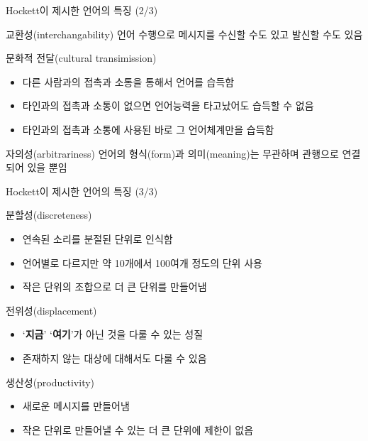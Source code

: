 \documentclass[11pt, aspectratio=169]{beamer}
\begin{document}
\begin{frame}[t]{Hockett이 제시한 언어의 특징 (2/3)}
  \begin{block}{교환성(interchangability)}
    언어 수행으로 메시지를 수신할 수도 있고 발신할 수도 있음
  \end{block}
  \begin{block}{문화적 전달(cultural transimission)}
    \begin{itemize}
      \item 다른 사람과의 접촉과 소통을 통해서 언어를 습득함
      \item 타인과의 접촉과 소통이 없으면 언어능력을 타고났어도 습득할 수 없음
      \item 타인과의 접촉과 소통에 사용된 바로 그 언어체계만을 습득함
    \end{itemize}
  \end{block}
  \begin{block}{자의성(arbitrariness)}
    언어의 형식(form)과 의미(meaning)는 무관하며 관행으로 연결되어 있을 뿐임
  \end{block}
\end{frame}

\begin{frame}[t]{Hockett이 제시한 언어의 특징 (3/3)}
  \begin{block}{분할성(discreteness)}
    \begin{itemize}
      \item 연속된 소리를 분절된 단위로 인식함
      \item 언어별로 다르지만 약 10개에서 100여개 정도의 단위 사용
      \item 작은 단위의 조합으로 더 큰 단위를 만들어냄
    \end{itemize}
  \end{block}
  \begin{block}{전위성(displacement)}
    \begin{itemize}
      \item ‘\textbf{지금}’ ‘\textbf{여기}’가 아닌 것을 다룰 수 있는 성질
      \item 존재하지 않는 대상에 대해서도 다룰 수 있음
    \end{itemize}
  \end{block}
  \begin{block}{생산성(productivity)}
    \begin{itemize}
      \item 새로운 메시지를 만들어냄
      \item 작은 단위로 만들어낼 수 있는 더 큰 단위에 제한이 없음
    \end{itemize}
  \end{block}
\end{frame}
\end{document}
